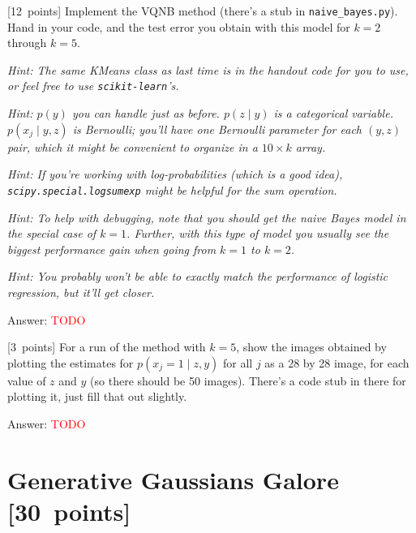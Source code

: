 \documentclass{article}
\newcommand{\ask}[1]{\textcolor{question}{#1}}
\newenvironment{answer}{\par\begingroup\color{answer}Answer: }{\endgroup}
\newcommand{\red}[1]{\textcolor{red}{#1}}
\newcommand{\pts}[1]{\textcolor{points}{[#1~points]}}
\newcommand{\hint}[1]{\textcolor{black!60!white}{\emph{Hint: #1}}}
\newcommand{\TODO}{\red{TODO}}
\numberwithin{equation}{section}
\begin{document}
\begin{qlist}[resume]
\item \pts{12}
    Implement the VQNB method (there's a stub in \texttt{naive\_bayes.py}).
    \ask{Hand in your code, and the test error you obtain with this model for $k=2$ through $k=5$.}

    \hint{The same KMeans class as last time is in the handout code for you to use, or feel free to use \texttt{scikit-learn}'s.}

    \hint{
        $p(y)$ you can handle just as before.
        $p(z \mid y)$ is a categorical variable.
        $p(x_j \mid y, z)$ is Bernoulli; you'll have one Bernoulli parameter for each $(y, z)$ pair, which it might be convenient to organize in a $10 \times k$ array.
    }

    \hint{If you're working with log-probabilities (which is a good idea), \texttt{scipy.special.logsumexp} might be helpful for the sum operation.}

    \hint{To help with debugging, note that you should get the naive Bayes model in the special case of $k=1$. Further, with this type of model you usually see the biggest performance gain when going from $k=1$ to $k=2$.}

    \hint{You probably won't be able to exactly match the performance of logistic regression, but it'll get closer.}

\begin{answer}\TODO\end{answer}


\item \pts{3}
    For a run of the method with $k=5$,
    \ask{show the images obtained by plotting the estimates for $p(x_j = 1 \mid z, y)$ for all $j$ as a 28 by 28 image, for each value of $z$ and $y$} (so there should be 50 images).
    There's a code stub in there for plotting it, just fill that out slightly.

\begin{answer}\TODO\end{answer}



\end{qlist}


\clearpage
\section{Generative Gaussians Galore \pts{30}}
\end{document}
